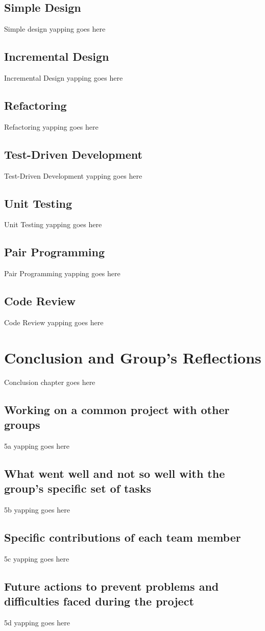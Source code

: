 \documentclass[12pt]{report}
\begin{document}
\section{Simple Design}
Simple design yapping goes here

\section{Incremental Design}
Incremental Design yapping goes here

\section{Refactoring}
Refactoring yapping goes here

\section{Test-Driven Development}
Test-Driven Development yapping goes here

\section{Unit Testing}
Unit Testing yapping goes here

\section{Pair Programming}
Pair Programming yapping goes here

\section{Code Review}
Code Review yapping goes here

\chapter{Conclusion and Group's Reflections}
Conclusion chapter goes here

\section{Working on a common project with other groups}
5a yapping goes here

\section{What went well and not so well with the group's specific set of tasks}
5b yapping goes here

\section{Specific contributions of each team member}
5c yapping goes here

\section{Future actions to prevent problems and difficulties faced during the project}
5d yapping goes here
\end{document}
